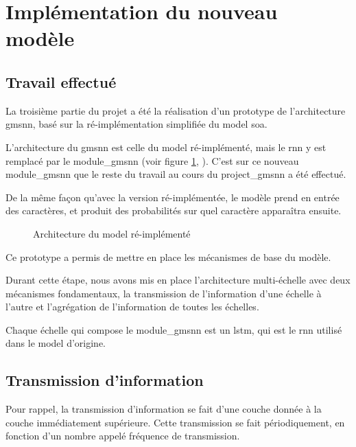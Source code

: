 \section{Implémentation du nouveau modèle}
\subsection{Travail effectué}\label{def:lstm_2}
La troisième partie du projet a été la réalisation d'un prototype de l'architecture \gls{gmsnn}, basé sur la ré-implémentation simplifiée du \gls{model} \gls{soa}.

L'architecture du \gls{gmsnn} est celle du \gls{model} ré-implémenté, mais le \gls{rnn} y est remplacé par le \gls{module_gmsnn} (voir figure \ref{fig:reimplement_gmsnn}, ). C'est sur ce nouveau \gls{module_gmsnn} que le reste du travail au cours du \gls{project_gmsnn} a été effectué.

De la même façon qu'avec la version ré-implémentée, le modèle prend en entrée des caractères, et produit des probabilités sur quel caractère apparaîtra ensuite.

\begin{figure}[ht]
	\centering
	\scalebox{1}{}
	\caption[Architecture du  ré-implémenté]{Architecture du \gls{model} ré-implémenté}\label{fig:reimplement_gmsnn}
\end{figure}

Ce prototype a permis de mettre en place les mécanismes de base du modèle.

Durant cette étape, nous avons mis en place l'architecture multi-échelle avec deux mécanismes fondamentaux, la transmission de l'information d'une échelle à l'autre et l'agrégation de l'information de toutes les échelles.

Chaque échelle qui compose le \gls{module_gmsnn} est un \gls{lstm}, qui est le \gls{rnn} utilisé dans le \gls{model} d'origine. 

\subsection{Transmission d'information}
Pour rappel, la transmission d'information se fait d'une couche donnée à la couche immédiatement supérieure.
Cette transmission se fait périodiquement, en fonction d'un nombre appelé fréquence de transmission.


